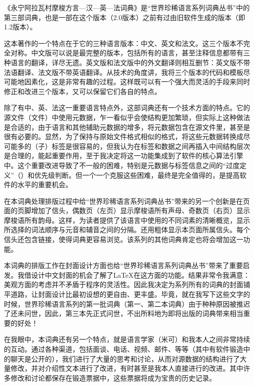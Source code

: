 《永宁阿拉瓦村摩梭方言—汉—英—法词典》是“世界珍稀语言系列词典丛书”中的第三部词典，也是一部在这个版本（2.0版本）之前有过由旧软件生成的版本（即1.2版本）。

这本著作的一个特点在于它的三种语言版本：中文、英文和法文。这三个版本不完全对称。中文版可以说是最完整的版本，包括所有的语言，甚至注释信息都带有三种语言的翻译，详尽无遗。英文版和法文版中的外文翻译则相互删节：英文版不带法语翻译、法文版不带英语翻译。从技术的角度讲，我将三个版本的代码和模板尽可能地因素化，这是非常有趣的过程。这样既可以有一个强大而灵活的手段来同时修正和改进三个版本，又可以保留它们各自的特点。

除了有中、英、法这一重要语言特点外，这部词典还有一个技术方面的特点。它的源文件（文件）中使用元数据，乍一看似乎会使结构更加繁琐，但实际上这种做法是合适的，由于语言和其他辅助元数据的增多，将元数据包含在源文件里，甚至是很有必要的。显然，为了保持与原始文件格式相似的格式，将这些元数据转换成尽可能多的（子）标签是很容易的，但我认为在标签和数据之间再插入中间结构层次是合理的，能起重要作用，至于我决定将这一功能集成到了软件的核心算法引擎中。这个重要改进导致了不一般的困难，特别是元数据与标签信息之间的“过度定义”（）和优先级判断。但一个一个克服这些困难，最终是完全值得的，是提高软件的水平的重要机会。

在本词典处理排版过程中给“世界珍稀语言系列词典丛书”带来的另一个创新是在页面的页脚增加了信头，偶数页（左页）显示摩梭语所有声母、奇数页（右页）显示摩梭语所有韵母。这样，为读者提供了该语言中使用的不同词素的清晰概览，显示所选择的词法顺序与元音和辅音之间的分隔。还用粗体显示本页面所属信头。每个信头还包含链接，使得词典更容易浏览。该系列的其他词典肯定也将会增加这一功能。

本词典的排版工作在封面设计方面也给“世界珍稀语言系列词典丛书”带来了重要启发。我借设计中文封面的机会了解了\LaTeX{}在这方面的功能。结果非常令我满意：美观方面的考虑并不矛盾于程序的灵活性。因此我决定为系列所有的词典的封面铺平道路，让封面设计比最初设想的更自由、更丰盛。毕竟，就在我写下这些文字的时候，世界珍稀语言系列的第一批词典（第一、第二本词典）由于种种原因被推迟了还未问世，因此，第三本先正式问世，不出所料地为即将出版的词典带来相当重要的好处！

在我眼中，本词典还有另一个特点，就是语言学家（米可）和我本人之间非常持续的互动。通过各种渠道，包括面谈、电话、视频、邮件、等等（其中有软件锻造中的聊天是公开的），我们进行了大量的思考和讨论，从而对源数据的结构进行了大量修改，并对介绍性文本进行了改进，有时甚至是我本人直接进行的改进。其中许多修改和讨论都保存在锻造票据中，这些票据将成为宝贵的历史记录。

